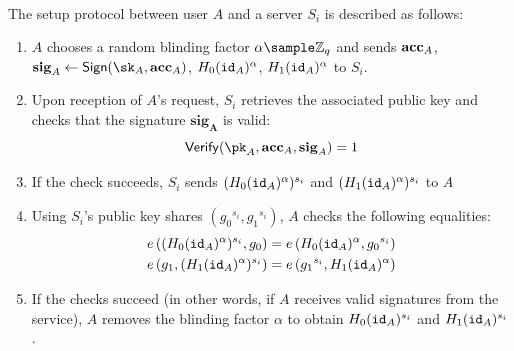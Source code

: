 		\paragraph{} The setup protocol between user $A$ and a server $S_i$ is described as follows:
		\begin{enumerate}
			\item $A$ chooses a random blinding factor $\alpha \sample \mathbb{Z}_q$ and sends $\mathbf{acc}_A$, $\mathbf{sig}_A \leftarrow \Sign(\sk_A, \acc_A)$, $H_0(\mathtt{id}_A)^\alpha$, $H_1(\mathtt{id}_A)^\alpha$ to $S_i$.
			\item Upon reception of $A$'s request, $S_i$ retrieves the associated public key and checks that the signature $\mathbf{sig_A}$ is valid:
			\begin{equation}
				\Verif(\pk_A, \acc_A, \mathbf{sig}_A) = 1
			\end{equation}
		\item If the check succeeds, $S_i$ sends $(H_0(\mathtt{id}_A)^\alpha)^{s_i}$ and $(H_1(\mathtt{id}_A)^\alpha)^{s_i}$ to $A$
		\item Using $S_i$'s public key shares $({g_0}^{s_i}, {g_1}^{s_i})$, $A$ checks the following equalities:
		\begin{align}
			e\left((H_0(\mathtt{id}_A)^\alpha)^{s_i}, g_0 \right) &= e\left(H_0(\mathtt{id}_A)^\alpha, {g_0}^{s_i} \right) \\
			e\left(g_1, (H_1(\mathtt{id}_A)^\alpha)^{s_i} \right) &= e\left({g_1}^{s_i}, H_1(\mathtt{id}_A)^\alpha \right)
		\end{align}
		\item If the checks succeed (in other words, if $A$ receives valid signatures from the service), $A$ removes the blinding factor $\alpha$ to obtain $H_0(\mathtt{id}_A)^{s_i}$ and $H_1(\mathtt{id}_A)^{s_i}$.
		\end{enumerate}
		
		
	
